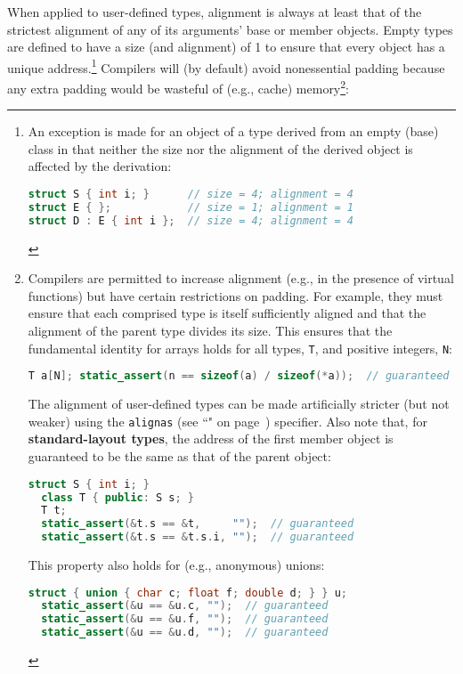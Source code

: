 When applied to user-defined types, alignment is always at least that of
the strictest alignment of any of its arguments' base or member objects.
Empty types are defined to have a size (and alignment) of 1 to
ensure that every object has a unique address.{\cprotect\footnote{An
exception is made for an object of a type derived from an empty (base)
class in that neither the size nor the alignment of the derived object
is affected by the derivation:

\begin{lstlisting}[language=C++, basicstyle={\ttfamily\footnotesize}]
struct S { int i; }      // size = 4; alignment = 4
struct E { };            // size = 1; alignment = 1
struct D : E { int i };  // size = 4; alignment = 4
\end{lstlisting}
      }} Compilers will (by default) avoid nonessential padding because any
extra padding would be wasteful of (e.g., cache)
memory{\cprotect\footnote{Compilers are permitted to increase alignment
(e.g., in the presence of virtual functions) but have certain restrictions
on padding. For example, they must ensure that each comprised type is
itself sufficiently aligned and that the alignment of the parent type
divides its size. This ensures that the fundamental identity for
arrays holds for all types, \texttt{T}, and positive integers,
\texttt{N}:

\begin{lstlisting}[language=C++, basicstyle={\ttfamily\footnotesize}]
T a[N]; static_assert(n == sizeof(a) / sizeof(*a));  // guaranteed
\end{lstlisting}
    
\noindent The alignment of user-defined types can be made artificially stricter
  (but not weaker) using the {\tt alignas} (see ``" on page~\pageref{alignas}) specifier.
  Also note that, for \textbf{standard-layout types}, the address of the
  first member object is guaranteed to be the same as that of the parent
  object:

  \begin{lstlisting}[language=C++, basicstyle={\ttfamily\footnotesize}]
  struct S { int i; }
  class T { public: S s; }
  T t;
  static_assert(&t.s == &t,     "");  // guaranteed
  static_assert(&t.s == &t.s.i, "");  // guaranteed
  \end{lstlisting}
      
\noindent This property also holds for (e.g., anonymous) unions:

  \begin{lstlisting}[language=C++, basicstyle={\ttfamily\footnotesize}]
  struct { union { char c; float f; double d; } } u;
  static_assert(&u == &u.c, "");  // guaranteed
  static_assert(&u == &u.f, "");  // guaranteed
  static_assert(&u == &u.d, "");  // guaranteed
  \end{lstlisting}
      }}:

